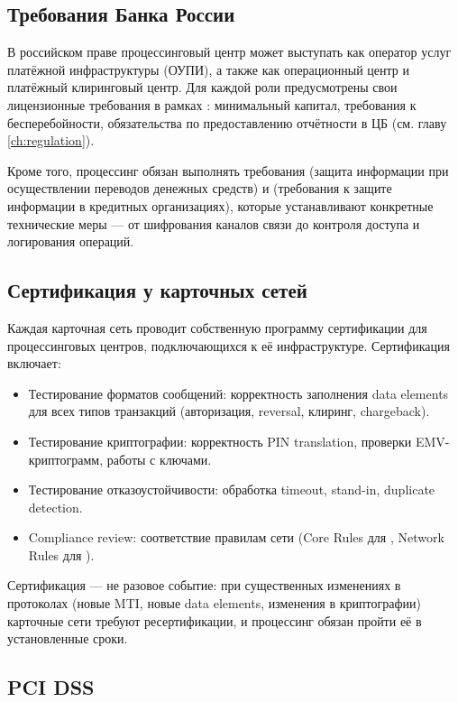 \subsection*{Требования Банка России}

В российском праве процессинговый центр может выступать
как оператор услуг платёжной инфраструктуры (ОУПИ),
а также как операционный центр и платёжный клиринговый центр.
Для каждой роли предусмотрены свои лицензионные требования
в рамках : минимальный капитал, требования
к бесперебойности, обязательства по предоставлению отчётности
в ЦБ (см. главу \ref{ch:regulation}).

Кроме того, процессинг обязан выполнять требования
 (защита информации при осуществлении переводов
денежных средств) и  (требования к защите
информации в кредитных организациях), которые устанавливают
конкретные технические меры — от шифрования каналов связи
до контроля доступа и логирования операций.

\subsection*{Сертификация у карточных сетей}

Каждая карточная сеть проводит собственную программу
сертификации для процессинговых центров, подключающихся
к её инфраструктуре. Сертификация включает:

\begin{itemize}
  \item Тестирование форматов сообщений: корректность заполнения
        data elements  для всех типов транзакций
        (авторизация, reversal, клиринг, chargeback).
  \item Тестирование криптографии: корректность PIN translation,
        проверки EMV-криптограмм, работы с ключами.
  \item Тестирование отказоустойчивости: обработка timeout,
        stand-in, duplicate detection.
  \item Compliance review: соответствие правилам сети (Core Rules для , Network Rules для ).
\end{itemize}

Сертификация — не разовое событие: при существенных изменениях
в протоколах (новые MTI, новые data elements, изменения
в криптографии) карточные сети требуют ресертификации,
и процессинг обязан пройти её в установленные сроки.

\subsection*{PCI DSS}

